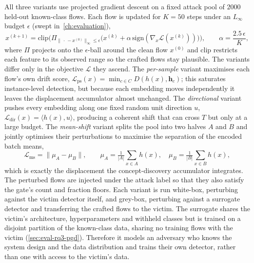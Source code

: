 All three variants use projected gradient descent on a fixed attack pool of $2000$ held-out known-class flows. Each flow is updated for $K = 50$ steps under an $L_\infty$ budget $\epsilon$ (swept in~\cref{ch:evaluation}),
\begin{equation} \label{eq:pgd-step}
x^{(k+1)} = \mathrm{clip}\Big( \Pi_{\|\,\cdot\, - x^{(0)}\|_\infty \le \epsilon}\big( x^{(k)} + \alpha \,\mathrm{sign}(\nabla_x \mathcal{L}(x^{(k)})) \big) \Big), \qquad \alpha = \frac{2.5\,\epsilon}{K},
\end{equation}
where $\Pi$ projects onto the $\epsilon$-ball around the clean flow $x^{(0)}$ and $\mathrm{clip}$ restricts each feature to its observed range so the crafted flows stay plausible. The variants differ only in the objective $\mathcal{L}$ they ascend. The \emph{per-sample} variant maximises each flow's own drift score, $\mathcal{L}_{\mathrm{ps}}(x) = \min_{c \in C} D(h(x), \bm{h}_c)$; this saturates instance-level detection, but because each embedding moves independently it leaves the displacement accumulator almost unchanged. The \emph{directional} variant pushes every embedding along one fixed random unit direction $u$, $\mathcal{L}_{\mathrm{dir}}(x) = \langle h(x), u \rangle$, producing a coherent shift that can cross $T$ but only at a large budget. The \emph{mean-shift} variant splits the pool into two halves $A$ and $B$ and jointly optimises their perturbations to maximise the separation of the encoded batch means,
\begin{equation} \label{eq:meanshift}
\mathcal{L}_{\mathrm{ms}} = \big\| \mu_A - \mu_B \big\|, \qquad \mu_A = \tfrac{1}{|A|}\sum_{x \in A} h(x), \quad \mu_B = \tfrac{1}{|B|}\sum_{x \in B} h(x),
\end{equation}
which is exactly the displacement the concept-discovery accumulator integrates. The perturbed flows are injected under the attack label so that they also satisfy the gate's count and fraction floors. Each variant is run white-box, perturbing against the victim detector itself, and grey-box, perturbing against a surrogate detector and transferring the crafted flows to the victim. The surrogate shares the victim's architecture, hyperparameters and withheld classes but is trained on a disjoint partition of the known-class data, sharing no training flows with the victim (\cref{sec:eval-rq3-pgd}). Therefore it models an adversary who knows the system design and the data distribution and trains their own detector, rather than one with access to the victim's data.

